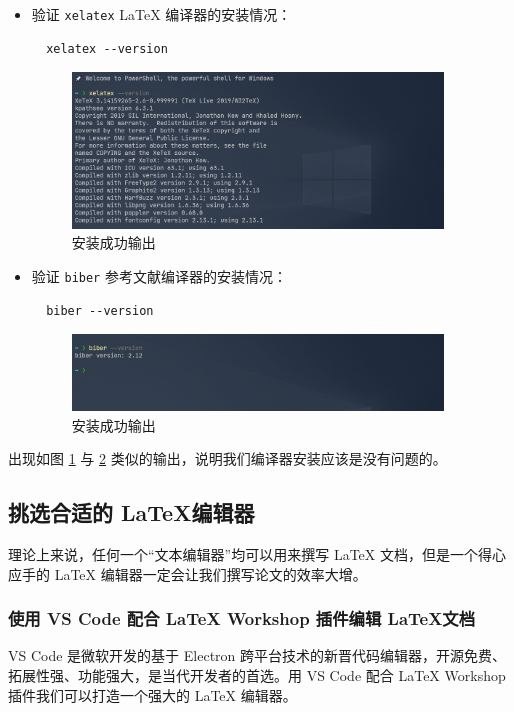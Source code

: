 \begin{itemize}
  \item 验证 \texttt{xelatex} {\LaTeX} 编译器的安装情况：
  \begin{verbatim}
  xelatex --version
  \end{verbatim}
  \begin{figure}[H]
    \flushright
    \includegraphics[width=0.93\textwidth]{images/xelatex.png}
    \caption{ 安装成功输出}
    \label{xelatex}
  \end{figure}
  \item 验证 \texttt{biber} 参考文献编译器的安装情况：
  \begin{verbatim}
  biber --version
  \end{verbatim}
  \begin{figure}[H]
    \flushright
    \includegraphics[width=0.93\textwidth]{images/biber.png}
    \caption{ 安装成功输出}
    \label{biber}
  \end{figure}
\end{itemize}

出现如图 \ref{xelatex} 与 \ref{biber} 类似的输出，说明我们编译器安装应该是没有问题的。

\subsection{挑选合适的 \LaTeX 编辑器}
理论上来说，任何一个“文本编辑器”均可以用来撰写 {\LaTeX} 文档，但是一个得心应手的 {\LaTeX} 编辑器一定会让我们撰写论文的效率大增。

\subsubsection{使用 VS Code 配合 {\LaTeX} Workshop 插件编辑 \LaTeX 文档}
VS Code 是微软开发的基于 Electron 跨平台技术的新晋代码编辑器，开源免费、拓展性强、功能强大，是当代开发者的首选。用 VS Code 配合 {\LaTeX} Workshop 插件我们可以打造一个强大的 {\LaTeX} 编辑器。

